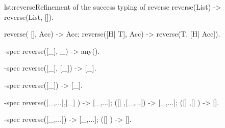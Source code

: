 \begin{console}{lst:reverse}{Refinement of the success typing of reverse}
reverse(List) ->
  reverse(List, []).

reverse(    [], Acc) -> Acc;
reverse([H| T], Acc) -> reverse(T, [H| Acc]).

-spec reverse([_], _) -> any().

-spec reverse([_], [_]) -> [_].

-spec reverse([_]) -> [_].

-spec reverse([_,...],[_]    ) -> [_,...];
             ([]     ,[_,...]) -> [_,...]; 
             ([]     ,[]     ) -> [].

-spec reverse([_,...]) -> [_,...];
             ([]     ) -> [].
\end{console}
